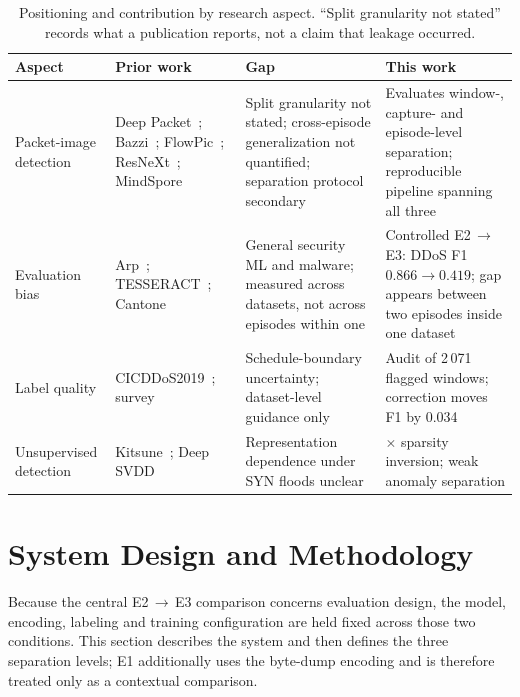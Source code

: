 \documentclass[conference]{IEEEtran} \IEEEoverridecommandlockouts
\begin{document}
\begin{table}[!tb]
\centering
\caption{Positioning and contribution by research aspect. ``Split granularity
         not stated'' records what a publication reports, not a claim that
         leakage occurred.}
\label{tab:related}
\renewcommand{\arraystretch}{1.1}
\footnotesize
\begin{tabular}{@{}>{\RaggedRight\arraybackslash}p{2.0cm}
                   >{\RaggedRight\arraybackslash}p{4.0cm}
                   >{\RaggedRight\arraybackslash}p{5.1cm}
                   >{\RaggedRight\arraybackslash}p{5.2cm}@{}}
\toprule
\textbf{Aspect} & \textbf{Prior work} & \textbf{Gap} & \textbf{This work} \\
\midrule
Packet-image detection
  & Deep Packet~\cite{lotfollahi2020deep}; Bazzi~\cite{bazzi2024resnet}; FlowPic~\cite{shapira2019flowpic}; ResNeXt~\cite{xie2017aggregated}; MindSpore~\cite{mindspore}
  & Split granularity not stated; cross-episode generalization not quantified; separation protocol secondary
  & Evaluates window-, capture- and episode-level separation; reproducible pipeline spanning all three \\
Evaluation bias
  & Arp~\cite{arp2022dos}; TESSERACT~\cite{pendlebury2019tesseract}; Cantone~\cite{cantone2024crossdataset}
  & General security ML and malware; measured across datasets, not across episodes within one
  & Controlled E2\,$\to$\,E3: DDoS F1 $0.866 \to 0.419$; gap appears between two episodes inside one dataset \\
Label quality
  & CICDDoS2019~\cite{sharafaldin2019ddos}; survey~\cite{goldschmidt2025datasets}
  & Schedule-boundary uncertainty; dataset-level guidance only
  & Audit of 2\,071 flagged windows; correction moves F1 by 0.034 \\
Unsupervised detection
  & Kitsune~\cite{mirsky2018kitsune}; Deep SVDD~\cite{ruff2018deep}
  & Representation dependence under SYN floods unclear
  & 3.7$\times$ sparsity inversion; weak anomaly separation \\
\bottomrule
\end{tabular}
\end{table}

\section{System Design and Methodology}
\label{sec:method}

Because the central E2\,$\to$\,E3 comparison concerns evaluation design, the
model, encoding, labeling and training configuration are held fixed across
those two conditions. This section describes the system and then defines the
three separation levels; E1 additionally uses the byte-dump encoding and is
therefore treated only as a contextual comparison.
\end{document}
